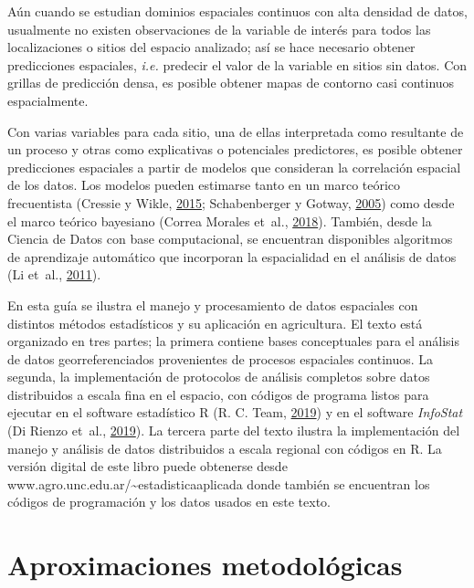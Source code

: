 \documentclass[11pt,b5paper,]{krantz}
\begin{document}
Aún cuando se estudian dominios espaciales continuos con alta densidad
de datos, usualmente no existen observaciones de la variable de interés
para todos las localizaciones o sitios del espacio analizado; así se
hace necesario obtener predicciones espaciales, \emph{i.e.} predecir el
valor de la variable en sitios sin datos. Con grillas de predicción
densa, es posible obtener mapas de contorno casi continuos
espacialmente.

Con varias variables para cada sitio, una de ellas interpretada como
resultante de un proceso y otras como explicativas o potenciales
predictores, es posible obtener predicciones espaciales a partir de
modelos que consideran la correlación espacial de los datos. Los modelos
pueden estimarse tanto en un marco teórico frecuentista (Cressie y
Wikle, \protect\hyperlink{ref-Cressie_Wikle_2015}{2015}; Schabenberger y
Gotway, \protect\hyperlink{ref-Schabenberger_Gotway_2005}{2005}) como
desde el marco teórico bayesiano (Correa Morales et~al.,
\protect\hyperlink{ref-Correa_Morales_Causil_Javier_2018}{2018}).
También, desde la Ciencia de Datos con base computacional, se encuentran
disponibles algoritmos de aprendizaje automático que incorporan la
espacialidad en el análisis de datos (Li et~al.,
\protect\hyperlink{ref-Li_Heap_Potter_Daniell_2011}{2011}).

En esta guía se ilustra el manejo y procesamiento de datos espaciales
con distintos métodos estadísticos y su aplicación en agricultura. El
texto está organizado en tres partes; la primera contiene bases
conceptuales para el análisis de datos georreferenciados provenientes de
procesos espaciales continuos. La segunda, la implementación de
protocolos de análisis completos sobre datos distribuidos a escala fina
en el espacio, con códigos de programa listos para ejecutar en el
software estadístico R (R. C. Team,
\protect\hyperlink{ref-R_Core_Team_2019}{2019}) y en el software
\emph{InfoStat} (Di Rienzo et~al.,
\protect\hyperlink{ref-Di_Rienzo_Casanoves_Balzarini_Gonzalez_Tablada_Robledo_2019}{2019}).
La tercera parte del texto ilustra la implementación del manejo y
análisis de datos distribuidos a escala regional con códigos en R. La
versión digital de este libro puede obtenerse desde
www.agro.unc.edu.ar/\textasciitilde{}estadisticaaplicada donde también
se encuentran los códigos de programación y los datos usados en este
texto.

\mainmatter

\cleardoublepage 

\part{Aproximaciones
metodológicas}\label{part-aproximaciones-metodoluxf3gicas}
\end{document}
